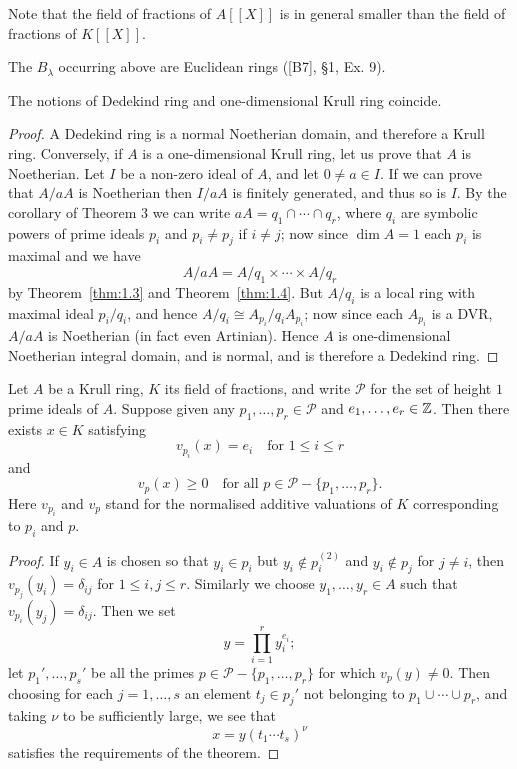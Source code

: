 \begin{remark}
Note that the field of fractions of $A[[X]]$ is in general smaller
than the field of fractions of $K[[X]]$.
\end{remark}

\begin{remark}
The $B_\lambda$ occurring above are Euclidean rings ([B7], \S1, Ex. 9).
\end{remark}

\begin{theorem}\label{thm:12.5}
The notions of Dedekind ring and one-dimensional Krull
ring coincide.
\end{theorem}

\begin{proof}
A Dedekind ring is a normal Noetherian domain, and therefore a
Krull ring. Conversely, if $A$ is a one-dimensional Krull ring, let us prove that
$A$ is Noetherian. Let $I$ be a non-zero ideal of $A$, and let $0 \neq a \in I$. If we can
prove that $A/aA$ is Noetherian then $I/aA$ is finitely generated, and thus so is
$I$. By the corollary of Theorem 3 we can write $aA = q_1 \cap \cdots \cap q_r$, where
$q_i$ are symbolic powers of prime ideals $p_i$ and $p_i \neq p_j$ if $i \neq j$; now since
$\dim A = 1$ each $p_i$ is maximal and we have
\[
  A/aA = A/q_1 \times \cdots \times A/q_r
\]
by Theorem~\ref{thm:1.3} and Theorem~\ref{thm:1.4}. But $A/q_i$ is a local ring with maximal
ideal $p_i/q_i$, and hence $A/q_i \cong A_{p_i}/q_iA_{p_i}$; now since each $A_{p_i}$ is a DVR, $A/aA$ is
Noetherian (in fact even Artinian). Hence $A$ is one-dimensional Noetherian
integral domain, and is normal, and is therefore a Dedekind ring.
\end{proof}

\begin{theorem}\label{thm:12.6}
Let $A$ be a Krull ring, $K$ its field of fractions, and write $\mathcal{P}$
for the set of height $1$ prime ideals of $A$. Suppose given any $p_1, \ldots, p_r \in \mathcal{P}$
and $e_1, \ldots, e_r \in \mathbb{Z}$. Then there exists $x \in K$ satisfying
\[
  v_{p_i}(x) = e_i \quad \text{for } 1 \le i \le r
\]
and
\[
  v_p(x) \ge 0 \quad \text{for all } p \in \mathcal{P} - \{p_1, \ldots, p_r\}.
\]
Here $v_{p_i}$ and $v_p$ stand for the normalised additive valuations of $K$
corresponding to $p_i$ and $p$.
\end{theorem}

\begin{proof}
If $y_i \in A$ is chosen so that $y_i \in p_i$ but $y_i \notin p_i^{(2)}$ and $y_i \notin p_j$ for
$j \neq i$, then $v_{p_j}(y_i) = \delta_{ij}$ for $1 \le i, j \le r$. Similarly we choose $y_1, \ldots, y_r \in A$ such
that $v_{p_i}(y_j) = \delta_{ij}$. Then we set
\[
  y = \prod_{i=1}^{r} y_i^{e_i};
\]
let $p_1', \ldots, p_s'$ be all the primes $p \in \mathcal{P} - \{p_1, \ldots, p_r\}$ for which $v_p(y) \neq 0$.
Then choosing for each $j = 1, \ldots, s$ an element $t_j \in p_j'$ not belonging to
$p_1 \cup \cdots \cup p_r$, and taking $\nu$ to be sufficiently large, we see that
\[
  x = y(t_1 \cdots t_s)^\nu
\]
satisfies the requirements of the theorem.
\end{proof}

